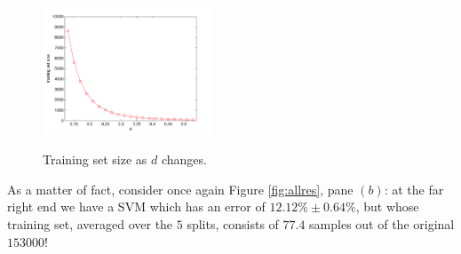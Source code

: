 \begin{figure}[!ht] \centering
  \includegraphics[width=0.45\textwidth]{figs/fig_allSize} \\
  \caption{Training set size as $d$ changes.}
  \label{fig:TSsize}
\end{figure}

As a matter of fact, consider once again Figure \ref{fig:allres}, pane
$(b)$: at the far right end we have a SVM which has an error of
$12.12\% \pm 0.64\%$, but whose training set, averaged over the $5$
splits, consists of $77.4$ samples out of the original $153000$!
